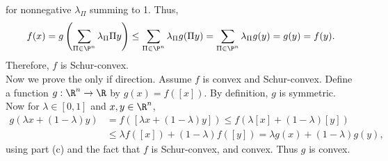 \documentclass[../borwein-lewis_notes.tex]{subfiles}
\begin{document}
\begin{enumerate}[(a)]
{for nonnegative $\lambda_{\Pi}$ summing to 1. Thus, 
\begin{equation*}
f(x) = g\left(\sum_{\Pi\in\P^n}\lambda_{\Pi}\Pi y\right)
\leq \sum_{\Pi\in\P^n} \lambda_{\Pi} g(\Pi y) 
= \sum_{\Pi\in\P^n} \lambda_{\Pi} g(y)  = g(y) = f(y).
\end{equation*}
Therefore, $f$ is Schur-convex. \\
Now we prove the only if direction. Assume $f$ is convex and Schur-convex.
Define a function $g:\R^n\to \R$ by $g(x) = f([x])$. By definition, 
$g$ is symmetric. Now for $\lambda\in[0,1]$ and $x,y\in\R^n$,
\begin{align*}
g(\lambda x + (1-\lambda)y) &= f([\lambda x + (1-\lambda)y])
\leq f(\lambda [x] + (1-\lambda)[y]) \\
&\leq \lambda f([x]) 
+ (1-\lambda)f([y]) = \lambda g(x) + (1-\lambda)g(y),
\end{align*}
using part (c) and the fact that $f$ is Schur-convex, and convex. 
Thus $g$ is convex.
}
\end{enumerate}
\newpage
\end{document}
